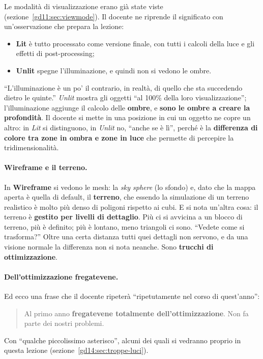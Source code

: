 Le modalità di visualizzazione erano già state viste
(sezione~\ref{gd11:sec:viewmode}). Il docente ne riprende il significato con
un'osservazione che prepara la lezione:
\begin{itemize}
  \item \textbf{Lit} è tutto processato come versione finale, con tutti i calcoli
        della luce e gli effetti di post-processing;
  \item \textbf{Unlit} spegne l'illuminazione, e quindi non si vedono le ombre.
\end{itemize}
``L'illuminazione è un po' il contrario, in realtà, di quello che sta succedendo
dietro le quinte.'' \emph{Unlit} mostra gli oggetti ``al 100\% della loro
visualizzazione''; l'illuminazione aggiunge il calcolo delle \textbf{ombre}, e
\textbf{sono le ombre a creare la profondità}. Il docente si mette in una posizione
in cui un oggetto ne copre un altro: in \emph{Lit} si distinguono, in
\emph{Unlit} no, ``anche se è lì'', perché è la \textbf{differenza di colore tra
zone in ombra e zone in luce} che permette di percepire la tridimensionalità.

\paragraph{Wireframe e il terreno.} In \textbf{Wireframe} si vedono le mesh: la
\emph{sky sphere} (lo sfondo) e, dato che la mappa aperta è quella di default, il
\textbf{terreno}, che essendo la simulazione di un terreno realistico è molto più
denso di poligoni rispetto ai cubi. E si nota un'altra cosa: il terreno è
\textbf{gestito per livelli di dettaglio}. Più ci si avvicina a un blocco di
terreno, più è definito; più è lontano, meno triangoli ci sono. ``Vedete come si
trasforma?'' Oltre una certa distanza tutti quei dettagli non servono, e da una
visione normale la differenza non si nota neanche. Sono \textbf{trucchi di
ottimizzazione}.

\paragraph{Dell'ottimizzazione fregatevene.} Ed ecco una frase che il docente
ripeterà ``ripetutamente nel corso di quest'anno'':
\begin{quote}
Al primo anno \textbf{fregatevene totalmente dell'ottimizzazione}. Non fa parte dei
nostri problemi.
\end{quote}
Con ``qualche piccolissimo asterisco'', alcuni dei quali si vedranno proprio in
questa lezione (sezione~\ref{gd14:sec:troppe-luci}).

